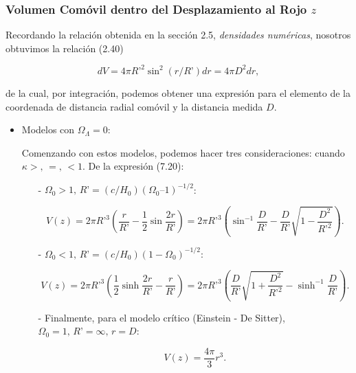 \documentclass[11pt]{article}
\begin{document}
{\subsubsection{Volumen Comóvil dentro del Desplazamiento al Rojo $z$}
    
    
    Recordando la relación obtenida en la sección 2.5, {\textit{densidades numéricas}}, nosotros obtuvimos la relación (2.40) 

\begin{equation}
	dV=4\pi R’^2 \sin^2(r/R’) dr = 4\pi D^2 dr,
\end{equation} 
    
    
    de la cual, por integración, podemos obtener una expresión para el elemento de la coordenada de distancia radial comóvil y la distancia medida $D$. 

\begin{itemize}

\item Modelos con $\Omega_{\Lambda} =0$:

Comenzando con estos modelos, podemos hacer tres consideraciones: cuando $\kappa >, \, =, \, < 1$. De la expresión (7.20):

\begin{itemize}

\item[-] $\Omega_0 > 1, \, R’ = (c/H_0) (\Omega_0 – 1)^{-1/2}$:

\begin{equation}
V(z) = 2 \pi R’^3 \left( \frac{r}{R’} - \frac{1}{2} \sin \frac{2r}{R’} \right) = 2 \pi R’^3 \left( \sin^{-1} \frac{D}{R’} - \frac{D}{R’} \sqrt{1 - \frac{D^2}{R’^2}} \right). 
\end{equation}  

\item[-] $\Omega_0 <  1, \, R’ = (c/H_0) ( 1 - \Omega_0 )^{-1/2}$:

\begin{equation}
V(z) = 2 \pi R’^3 \left(  \frac{1}{2} \sinh \frac{2r}{R’} - \frac{r}{R’} \right) = 2 \pi R’^3  
\left( \frac{D}{R’} \sqrt{1 + \frac{D^2}{R’^2}} - \sinh^{-1} \frac{D}{R’}  \right). 
\end{equation} 

\item[-] Finalmente, para el modelo crítico (Einstein -  De Sitter), $\Omega_0 = 1, \, R’= \infty, \, r=D$:



\begin{equation}
V(z) = \frac{4 \pi}{3} r^3 . 
\end{equation}  



\end{itemize}
\end{itemize}}
\end{document}
